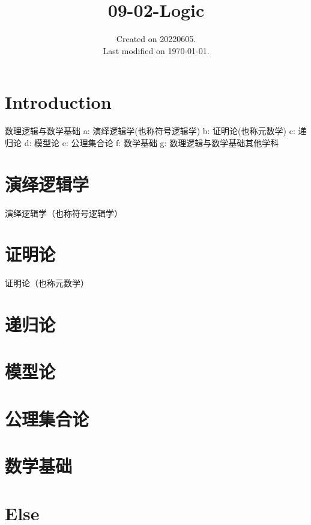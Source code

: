 \documentclass[UTF8]{../09-Mathematics}
\begin{document}
\title{09-02-Logic}
\date{Created on 20220605.\\   Last modified on \today.}
\maketitle
\tableofcontents


\chapter{Introduction}

数理逻辑与数学基础
a: 演绎逻辑学(也称符号逻辑学)
b: 证明论(也称元数学)
c: 递归论
d: 模型论
e: 公理集合论
f: 数学基础
g: 数理逻辑与数学基础其他学科




\chapter{演绎逻辑学}
演绎逻辑学（也称符号逻辑学）

\chapter{证明论}
证明论（也称元数学）

\chapter{递归论}
\chapter{模型论}
\chapter{公理集合论}
\chapter{数学基础}
\chapter{Else}
\end{document}
